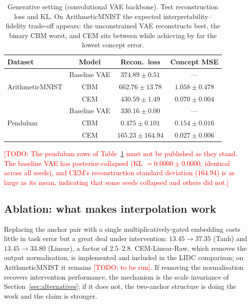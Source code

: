 \documentclass[11pt]{article}
\newcommand{\todo}[1]{\textcolor{red}{[TODO: #1]}}
\begin{document}
\begin{table}[t]
\centering
\caption{Generative setting (convolutional VAE backbone). Test reconstruction
loss and KL. On ArithmeticMNIST the expected interpretability--fidelity
trade-off appears: the unconstrained VAE reconstructs best, the binary CBM
worst, and CEM sits between while achieving by far the lowest concept error.}
\label{tab:gen}
\begin{tabular}{lccc}
\toprule
\textbf{Dataset} & \textbf{Model} & \textbf{Recon.\ loss} & \textbf{Concept MSE} \\
\midrule
\multirow{3}{*}{ArithmeticMNIST}
 & Baseline VAE & $\mathbf{374.89 \pm 0.51}$ & --- \\
 & CBM          & $662.76 \pm 13.78$ & $1.058 \pm 0.478$ \\
 & CEM          & $430.59 \pm 1.49$ & $\mathbf{0.070 \pm 0.004}$ \\
\midrule
\multirow{3}{*}{Pendulum}
 & Baseline VAE & $330.16 \pm 0.00$ & --- \\
 & CBM          & $0.475 \pm 0.101$ & $0.154 \pm 0.016$ \\
 & CEM          & $165.23 \pm 164.94$ & $\mathbf{0.027 \pm 0.006}$ \\
\bottomrule
\end{tabular}
\end{table}

\todo{The pendulum rows of Table~\ref{tab:gen} must not be published as they
stand. The baseline VAE has posterior-collapsed (KL $= 0.0000 \pm 0.0000$,
identical across all seeds), and CEM's reconstruction standard deviation
($164.94$) is as large as its mean, indicating that some seeds collapsed and
others did not.}

\subsection{Ablation: what makes interpolation work}
\label{sec:ablation}

Replacing the anchor pair with a single multiplicatively-gated embedding costs
little in task error but a great deal under intervention: $13.45 \to 37.35$
(Tanh) and $13.45 \to 33.80$ (Linear), a factor of $2.5$--$2.8$. CEM-Linear-Raw, which removes the output
normalisation, is implemented and included in the LIDC comparison; on
ArithmeticMNIST it remains \todo{to be run}. If removing the normalisation
recovers intervention performance, the mechanism is the scale invariance of
Section~\ref{sec:alternatives}; if it does not, the two-anchor structure is
doing the work and the claim is stronger.
\end{document}
